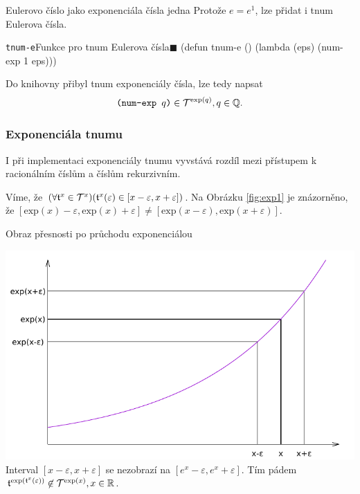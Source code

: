 \begin{myremarkbez}{Eulerovo číslo jako exponenciála čísla jedna}
Protože $e = e^1$, lze přidat i tnum Eulerova čísla.
\begin{lispcode}{\texttt{tnum-e}}{Funkce pro tnum Eulerova čísla\hfill$\blacksquare$}
(\textcolor{funkcionalni}{defun} \textcolor{pojmenovan}{tnum-e} ()
  (\textcolor{funkcionalni}{lambda} (eps)
    (\textcolor{moje}{num-exp} 1 eps)))
\end{lispcode}
\end{myremarkbez}

Do knihovny přibyl tnum exponenciály čísla, lze tedy napsat
\begin{equation}
\texttt{(num-exp } q \texttt{)}\in\mathcal{T}^{\mathrm{exp}(q)}, q\in\mathbb{Q}.
\end{equation}

\subsubsection{Exponenciála tnumu}
I při implementaci exponenciály tnumu vyvstává rozdíl mezi přístupem k racionálním číslům a číslům rekurzivním.

Víme, že $(\forall\mathfrak{t}^{x}\in\mathcal{T}^{x})(\mathfrak{t}^{x}(\varepsilon) \in [x-\varepsilon,x+\varepsilon])$. Na Obrázku \ref{fig:exp1} je znázorněno, že $[\mathrm{exp}(x)-\varepsilon,\mathrm{exp}(x)+\varepsilon]\neq[\mathrm{exp}(x-\varepsilon),\mathrm{exp}(x+\varepsilon)]$.

\begin{myfigure}{}
\caption{Obraz přesnosti po průchodu exponenciálou}
\includegraphics[width=\linewidth]{graphics/exp1.pdf}\label{fig:exp1}
Interval $[x-\varepsilon,x+\varepsilon]$ se nezobrazí na $[e^x-\varepsilon,e^x+\varepsilon]$. Tím pádem $\mathfrak{t}^{\mathrm{exp}(\mathfrak{t}^{x}(\varepsilon))}\not\in\mathcal{T}^{\mathrm{exp}(x)},x\in\mathbb{R}$.
\end{myfigure}

